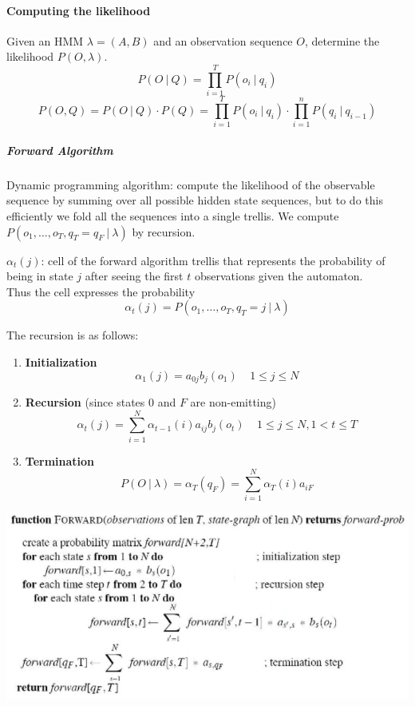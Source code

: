 \documentclass[10pt]{report}
\begin{document}
\paragraph{Computing the likelihood} Given an HMM $\lambda = (A, B)$ and an observation sequence $O$, determine the likelihood $P(O, \lambda)$.
$$P(O\:|\:Q)=\prod_{i=1}^T P(o_i\:|\:q_i)$$
$$P(O,Q) = P(O\:|\:Q)\cdot P(Q) = \prod_{i=1}^T P(o_i\:|\:q_i)\cdot\prod_{i=1}^n P(q_i\:|\:q_{i-1})$$
\subparagraph{Forward Algorithm} Dynamic programming algorithm: compute the likelihood of the observable sequence by summing over all possible hidden state sequences, but to do this efficiently we fold all the sequences into a single trellis. We compute $P(o_1,\ldots,o_T,q_T = q_F\:|\:\lambda)$ by recursion.\begin{list}{}{}
	\item $\alpha_t(j)$: cell of the forward algorithm trellis that represents the probability of being in state $j$ after seeing the first $t$ observations given the automaton.\\
	Thus the cell expresses the probability $$\alpha_t(j) = P(o_1,\ldots,o_T,q_T=j\:|\:\lambda)$$
	\item The recursion is as follows:
	\begin{enumerate}
		\item \textbf{Initialization} $$\alpha_1(j) = a_{0j}b_j(o_1)\:\:\:\:\:1\leq j\leq N$$
		\item \textbf{Recursion} (since states 0 and $F$ are non-emitting) $$\alpha_t(j) = \sum_{i=1}^N\alpha_{t-1}(i)a_{ij}b_j(o_t)\:\:\:\:\:1\leq j\leq N, 1<t\leq T$$
		\item \textbf{Termination} $$P(O\:|\:\lambda) =\alpha_T(q_F)=\sum_{i=1}^N\alpha_T(i)a_{iF}$$
	\end{enumerate}
\end{list}
\begin{center}
	\includegraphics[scale=0.5]{15.png}
\end{center}
\end{document}
